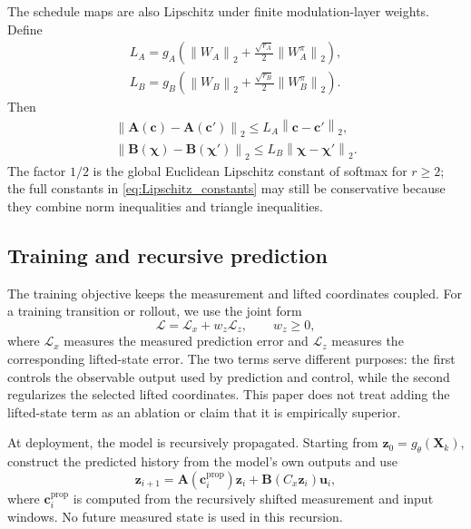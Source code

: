 ﻿\documentclass[journal]{IEEEtran}
\newcommand{\vu}{\mathbf{u}}
\newcommand{\vz}{\mathbf{z}}
\newcommand{\vc}{\mathbf{c}}
\newcommand{\vchi}{\boldsymbol{\chi}}
\newcommand{\mA}{\mathbf{A}}
\newcommand{\mB}{\mathbf{B}}
\newcommand{\mX}{\mathbf{X}}
\newcommand{\norm}[1]{\left\lVert #1\right\rVert}
\begin{document}
The schedule maps are also Lipschitz under finite modulation-layer weights. Define
\begin{equation}
    \begin{gathered}
    L_A=g_A\left(\norm{W_A}_2+\frac{\sqrt{r_A}}{2}\norm{W_A^\pi}_2\right),
    \\
    L_B=g_B\left(\norm{W_B}_2+\frac{\sqrt{r_B}}{2}\norm{W_B^\pi}_2\right).
    \end{gathered}
    \label{eq:Lipschitz_constants}
\end{equation}
Then
\begin{equation}
    \begin{gathered}
    \norm{\mA(\vc)-\mA(\vc')}_2\le L_A\norm{\vc-\vc'}_2,
    \\
    \norm{\mB(\vchi)-\mB(\vchi')}_2\le L_B\norm{\vchi-\vchi'}_2.
    \end{gathered}
    \label{eq:schedule_lipschitz}
\end{equation}
The factor $1/2$ is the global Euclidean Lipschitz constant of softmax for $r\ge2$; the full constants in \eqref{eq:Lipschitz_constants} may still be conservative because they combine norm inequalities and triangle inequalities.

\subsection{Training and recursive prediction}

The training objective keeps the measurement and lifted coordinates coupled. For a training transition or rollout, we use the joint form
\begin{equation}
    \mathcal L=\mathcal L_x+w_z\mathcal L_z,
    \qquad w_z\ge0,
    \label{eq:joint_training_loss}
\end{equation}
where $\mathcal L_x$ measures the measured prediction error and $\mathcal L_z$ measures the corresponding lifted-state error. The two terms serve different purposes: the first controls the observable output used by prediction and control, while the second regularizes the selected lifted coordinates. This paper does not treat adding the lifted-state term as an ablation or claim that it is empirically superior.

At deployment, the model is recursively propagated. Starting from $\vz_0=g_\theta(\mX_k)$, construct the predicted history from the model's own outputs and use
\begin{equation}
    \vz_{i+1}=\mA(\vc_i^{\mathrm{prop}})\vz_i+\mB(C_x\vz_i)\vu_i,
    \label{eq:recursive_prediction}
\end{equation}
where $\vc_i^{\mathrm{prop}}$ is computed from the recursively shifted measurement and input windows. No future measured state is used in this recursion.
\end{document}
